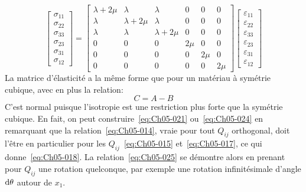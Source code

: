 \begin{equation}
    \begin{bmatrix}
        \sigma_{11}\\
        \sigma_{22}\\
        \sigma_{33}\\
        \sigma_{23}\\
        \sigma_{31}\\
        \sigma_{12}
    \end{bmatrix}
    =
    \begin{bmatrix}
        \lambda+2\mu & \lambda      & \lambda      & 0    & 0    & 0 \\
        \lambda      & \lambda+2\mu & \lambda      & 0    & 0    & 0 \\
        \lambda      & \lambda      & \lambda+2\mu & 0    & 0    & 0 \\
        0            & 0            & 0            & 2\mu & 0    & 0 \\
        0            & 0            & 0            & 0    & 2\mu & 0 \\
        0            & 0            & 0            & 0    & 0    & 2\mu
    \end{bmatrix}
    \begin{bmatrix}
        \varepsilon_{11}\\
        \varepsilon_{22}\\
        \varepsilon_{33}\\
        \varepsilon_{23}\\
        \varepsilon_{31}\\
        \varepsilon_{12}
    \end{bmatrix}
    \label{eq:Ch05-024}
\end{equation}
La matrice d'élasticité a la même forme que pour un matériau à symétrie cubique, avec en plus la relation: 
\begin{equation}
	C = A-B
	\label{eq:Ch05-025}
\end{equation}
C'est normal puisque l'isotropie est une restriction plus forte que la symétrie cubique.
En fait, on peut construire~\eqref{eq:Ch05-021} ou~\eqref{eq:Ch05-024} en remarquant que la relation~\eqref{eq:Ch05-014}, vraie pour tout $Q_{ij}$ orthogonal, doit l'être en particulier pour les $Q_{ij}$~\eqref{eq:Ch05-015} et~\eqref{eq:Ch05-017}, ce qui donne~\eqref{eq:Ch05-018}.
La relation~\eqref{eq:Ch05-025} se démontre alors en prenant pour $Q_{ij}$ une rotation quelconque, par exemple une rotation infinitésimale d'angle $\mathop{\mathrm{{}d}}\mathopen{} \theta$ autour de $x_1$. 

